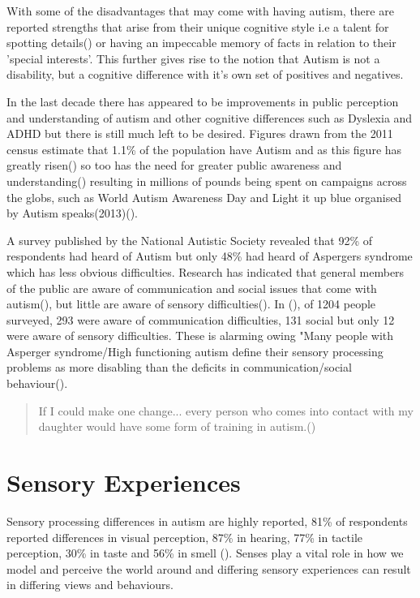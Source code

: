 \documentclass[11pt]{report}
\begin{document}
With some of the disadvantages that may come with having autism, there are reported strengths that arise from their unique cognitive style i.e a talent for spotting details(\cite{bayes}) or having an impeccable memory of facts in relation to their 'special interests'. This further gives rise to the notion that Autism is not a disability, but a cognitive difference with it's own set of positives and negatives. 

In the last decade there has appeared to be improvements in public perception and understanding of autism and other cognitive differences such as Dyslexia and ADHD but there is still much left to be desired. Figures drawn from the 2011 census estimate that 1.1\% of the population have Autism\cite{nas} and as this figure has greatly risen(\cite{increasingprevalence}) so too has the need for greater public awareness and understanding(\cite{autism_awareness}) resulting in millions of pounds being spent on campaigns across the globs, such as World Autism Awareness Day and Light it up blue organised by Autism speaks(2013)(\cite{autism_awareness}). 

A survey published by the National Autistic Society revealed that 92\% of respondents had heard of Autism but only 48\% had heard of Aspergers syndrome which has less obvious difficulties. Research has indicated that general members of the public are aware of communication and social issues that come with autism(\cite{autismmisconception}), but little are aware of sensory difficulties(\cite{autism_awareness}). In (\cite{autism_awareness}), of 1204 people surveyed, 293 were aware of communication difficulties, 131 social but only 12 were aware of sensory difficulties. These is alarming owing "Many people with Asperger syndrome/High functioning autism define their sensory processing problems as more disabling than the deficits in communication/social behaviour(\cite{olgab}).

\begin{quote}
If I could make one change... every person who comes into contact with my daughter would have some form of training in autism.(\cite{nasschool})
\end{quote}

\section{Sensory Experiences}
Sensory processing differences in autism are highly reported, 81\% of respondents reported differences in visual perception, 87\% in hearing, 77\% in tactile perception, 30\% in taste and 56\% in smell (\cite{sensory_leisure}). Senses play a vital role in how we model and perceive the world around and differing sensory experiences can result in differing views and behaviours.
 
\end{document}
